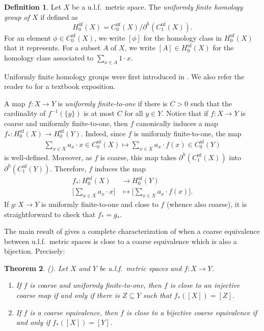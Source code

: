 \documentclass[11pt]{amsart}
\numberwithin{equation}{section}
\newtheorem{theorem}{Theorem}[section]
\theoremstyle{definition}
\newtheorem{definition}[theorem]{Definition}
\theoremstyle{remark}
\numberwithin{equation}{section}
\newcommand{\barh}{\partial^h}
\begin{document}
\begin{definition}
Let $X$ be a u.l.f.\ metric space. The \emph{uniformly finite homology group of $X$} if defined as 
\[
H_0^{\textrm{uf}}(X)=C_0^{\textrm{uf}}(X)/\barh(C_1^{\textrm{uf}}(X)).
\]
For an element $\phi\in C_0^{\textrm{uf}}(X)$, we write $[\phi]$ for the homology class in $H_0^{\textrm{uf}}(X)$ that it represents. For a subset $A$ of $X$, we write $[A]\in H_0^{\textrm{uf}}(X)$ for the homology class associated to $\sum_{x\in A}1\cdot x$.
\end{definition}
 
Uniformly finite homology groups were first introduced in \cite{Block:1992qp}. We also refer the reader to \cite[Section 7.2]{NowakYuBook} for a textbook exposition. 
 
A map $f\colon X\to Y$ is \emph{uniformly finite-to-one} if there is $C>0$ such that the cardinality of $f^{-1}(\{y\})$ is at most $C$ for all $y\in Y$. Notice that if $f\colon X\to Y$ is coarse and uniformly finite-to-one, then $f$ canonically induces a map $f_*\colon H_0^{\textrm{uf}}(X)\to H_0^{\textrm{uf}}(Y)$. Indeed, since $f$ is uniformly finite-to-one, the map 
\begin{align*}
\sum_{x\in X} a_x\cdot x\in C_0^{\textrm{uf}}(X) \mapsto \sum_{x\in X} a_x\cdot f(x)\in C_0^{\textrm{uf}}(Y)
\end{align*}
 is well-defined. Moreover, as $f$ is coarse, this map takes $ \barh(C_1^{\textrm{uf}}(X))$ into $ \barh(C_1^{\textrm{uf}}(Y))$. Therefore, $f$ induces the map 
\begin{align*}
f_*\colon H_0^{\textrm{uf}}(X)& \to H_0^{\textrm{uf}}(Y)\\
\Bigg[\sum_{x\in X} a_x\cdot x\Bigg]&\mapsto \Bigg[\sum_{x\in X} a_x\cdot f(x)\Bigg].
\end{align*} 
If $g\colon X\to Y$ is uniformly finite-to-one and close to $f$ (whence also coarse), it is straightforward to check that $f_*=g_*$. 

The main result of \cite{Whyte1999Duke} gives a complete characterization of when a coarse equivalence between u.l.f.\ metric spaces is close to a coarse equivalence which is also a bijection. Precisely:

\begin{theorem} \emph{(}\cite[Theorem 1.1]{Whyte1999Duke}\emph{).}
 Let $X$ and $Y$ be u.l.f.\ metric spaces and $f\colon X\to Y$. 
 \begin{enumerate}
 \item\label{Thm11WhyteItem1} If $f$ is coarse and uniformly finite-to-one, then $f$ is close to an injective coarse map if and only if there is $Z\subseteq Y$ such that $f_*([X])=[Z]$.
 \item\label{Thm11WhyteItem2}
If $f$ is a coarse equivalence, then $f$ is close to a bijective coarse equivalence if and only if $f_*([X])=[Y]$. %
\end{enumerate}\label{Thm11Whyte}
\end{theorem}
\end{document}
